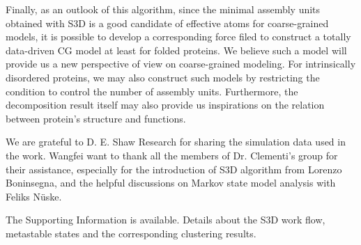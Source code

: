\documentclass[journal=jacsat,manuscript=article]{achemso}
\begin{document}
Finally, as an outlook of this algorithm, since the minimal assembly units obtained with S3D is a good candidate of effective atoms for coarse-grained models, it is possible to develop a corresponding force filed to construct a totally data-driven CG model at least for folded proteins. We believe such a model will provide us a new perspective of view on coarse-grained modeling. For intrinsically disordered proteins, we may also construct such models by restricting the condition to control the number of assembly units. Furthermore, the decomposition result itself may also provide us inspirations on the relation between protein's structure and functions.

\begin{acknowledgement}

We are grateful to D. E. Shaw Research for sharing the simulation data used in the work.  Wangfei want to thank all the members of Dr. Clementi's group for their assistance, especially for the introduction of S3D algorithm from Lorenzo Boninsegna, and the helpful discussions on Markov state model analysis with Feliks Nüske. 

\end{acknowledgement}

\begin{suppinfo}

The Supporting Information is available. Details about the S3D work flow, metastable states and the corresponding clustering results.

\end{suppinfo}


\end{document}
